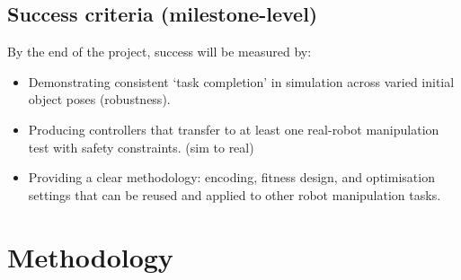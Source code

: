 \documentclass[12pt,a4paper,twocolumn]{article}
\begin{document}
\subsection{Success criteria (milestone-level)}
By the end of the project, success will be measured by:
\begin{itemize}
    \item Demonstrating consistent `task completion' in simulation across varied initial object poses (robustness).
    \item Producing controllers that transfer to at least one real-robot manipulation test with safety constraints. (sim to real)
    \item Providing a clear methodology: encoding, fitness design, and optimisation settings that can be reused and applied to other robot manipulation tasks.
\end{itemize}

\section{Methodology}


\end{document}
